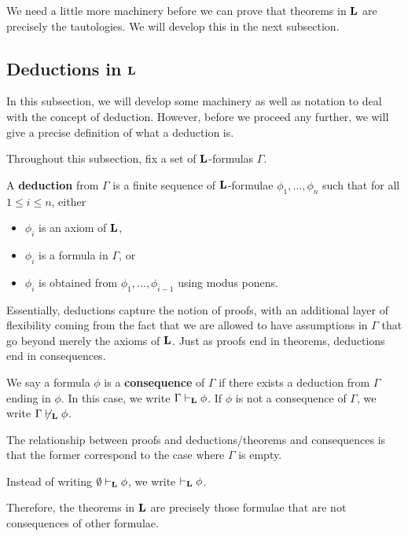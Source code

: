 We need a little more machinery before we can prove that theorems in $\mathbf{L}$ are precisely the tautologies. We will develop this in the next subsection.

\subsection{Deductions in $\mathbf{L}$}

In this subsection, we will develop some machinery as well as notation to deal with the concept of deduction. However, before we proceed any further, we will give a precise definition of what a deduction is.

Throughout this subsection, fix a set of $\mathbf{L}$-formulas $\Gamma$.

\begin{boxdefinition}[Deduction]\label{Ch1:Def:Deduction}
    A \textbf{deduction} from $\Gamma$ is a finite sequence of $\mathbf{L}$-formulae $\phi_1, \ldots, \phi_n$ such that for all $1 \leq i \leq n$, either
    \begin{itemize}%
        \item $\phi_i$ is an axiom of $\mathbf{L}$,
        \item $\phi_i$ is a formula in $\Gamma$, or
        \item $\phi_i$ is obtained from $\phi_1, \ldots, \phi_{i-1}$ using modus ponens.
    \end{itemize}
\end{boxdefinition}

Essentially, deductions capture the notion of proofs, with an additional layer of flexibility coming from the fact that we are allowed to have assumptions in $\Gamma$ that go beyond merely the axioms of $\mathbf{L}$. Just as proofs end in theorems, deductions end in consequences.

\begin{boxdefinition}[Consequence]
    We say a formula $\phi$ is a \textbf{consequence} of $\Gamma$ if there exists a deduction from $\Gamma$ ending in $\phi$. In this case, we write $\Gamma \vdash_{\mathbf{L}} \phi$. If $\phi$ is not a consequence of $\Gamma$, we write $\Gamma \not\vdash_{\mathbf{L}} \phi$.
\end{boxdefinition}

The relationship between proofs and deductions/theorems and consequences is that the former correspond to the case where $\Gamma$ is empty.
\begin{boxconvention}
    Instead of writing $\emptyset \vdash_{\mathbf{L}} \phi$, we write $\vdash_{\mathbf{L}} \phi$.
\end{boxconvention}
Therefore, the theorems in $\mathbf{L}$ are precisely those formulae that are not consequences of other formulae.

